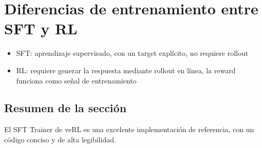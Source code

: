 \section{Diferencias de entrenamiento entre SFT y RL}
\begin{itemize}
  \item SFT: aprendizaje supervisado, con un target explícito, no requiere rollout
  \item RL: requiere generar la respuesta mediante rollout en línea, la reward funciona como señal de entrenamiento
\end{itemize}

\subsection{Resumen de la sección}
El SFT Trainer de veRL es una excelente implementación de referencia, con un código conciso y de alta legibilidad.

\newpage
